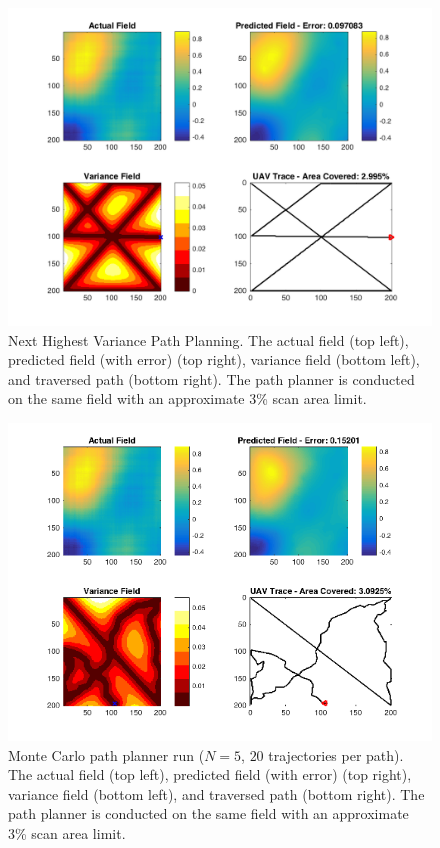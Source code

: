 \begin{figure}[htb!]
    \centering
    \includegraphics[width=0.8\linewidth]{figures/nhv_200x200_10_percent.png}
	\captionsetup{skip=0.25\baselineskip}
	\ssp
    \caption{Next Highest Variance Path Planning. The actual field (top left), predicted field (with error) (top right), variance field (bottom left), and traversed path (bottom right). The path planner is conducted on the same field with an approximate 3\% scan area limit.}
\end{figure}
\begin{figure}[htb!]
    \centering
    \includegraphics[width=0.8\linewidth]{figures/mcpp_200x200_3_percent_mck_5_rands_20.png}
	\captionsetup{skip=0.25\baselineskip}
	\ssp
    \caption{Monte Carlo path planner run ($N=5$, $20$ trajectories per path). The actual field (top left), predicted field (with error) (top right), variance field (bottom left), and traversed path (bottom right). The path planner is conducted on the same field with an approximate 3\% scan area limit.}
\end{figure}
